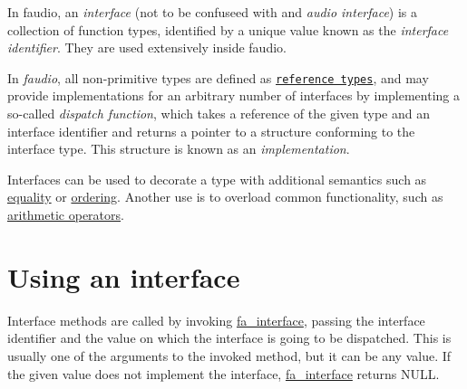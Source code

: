 \label{md__interfaces_Interfaces}%
\hypertarget{md__interfaces_Interfaces}{}%


In faudio, an {\itshape interface} (not to be confuseed with and {\itshape audio interface}) is a collection of function types, identified by a unique value known as the {\itshape interface identifier}. They are used extensively inside faudio.

In {\itshape faudio}, all non-\/primitive types are defined as \href{http://en.wikipedia.org/wiki/Reference_type}{\tt reference types}, and may provide implementations for an arbitrary number of interfaces by implementing a so-\/called {\itshape dispatch function}, which takes a reference of the given type and an interface identifier and returns a pointer to a structure conforming to the interface type. This structure is known as an {\itshape implementation}.

Interfaces can be used to decorate a type with additional semantics such as \hyperlink{structfa__equal__t}{equality} or \hyperlink{structfa__order__t}{ordering}. Another use is to overload common functionality, such as \hyperlink{structfa__number__t}{arithmetic operators}.


\hypertarget{md__interfaces_Using}{}\section{Using an interface}\label{md__interfaces_Using}
Interface methods are called by invoking \hyperlink{group___fa_ga1cc4276643f3d366681ac7ff71fa8b06}{fa\-\_\-interface}, passing the interface identifier and the value on which the interface is going to be dispatched. This is usually one of the arguments to the invoked method, but it can be any value. If the given value does not implement the interface, \hyperlink{group___fa_ga1cc4276643f3d366681ac7ff71fa8b06}{fa\-\_\-interface} returns {\ttfamily N\-U\-L\-L}.

